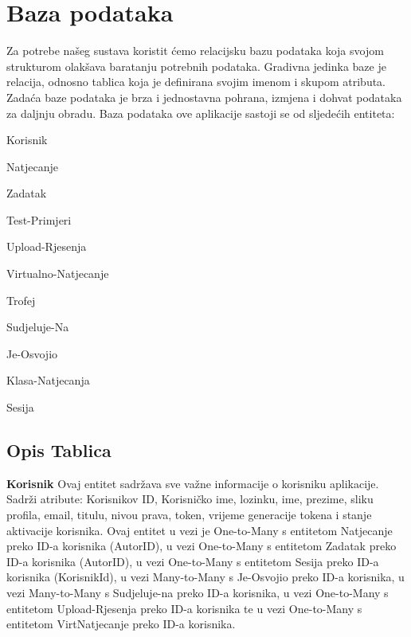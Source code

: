 				
		\section{Baza podataka}
		
		
		
		\noindent Za potrebe našeg sustava koristit  ćemo relacijsku bazu podataka koja svojom strukturom olakšava baratanju potrebnih podataka. Gradivna jedinka baze je relacija, odnosno tablica koja je definirana svojim imenom i skupom atributa. Zadaća baze podataka je brza i jednostavna pohrana, izmjena i dohvat podataka za daljnju obradu.
		Baza podataka ove aplikacije sastoji se od sljedećih entiteta:
		\begin{packed_item}
			\item Korisnik
			\item Natjecanje
			\item Zadatak
			\item Test-Primjeri
			\item Upload-Rjesenja
			\item Virtualno-Natjecanje
			\item Trofej
			\item Sudjeluje-Na
			\item Je-Osvojio
			\item Klasa-Natjecanja
			\item Sesija
		\end{packed_item}
		\subsection{Opis Tablica}
		\noindent \textbf{Korisnik} \space \space Ovaj entitet sadržava sve važne informacije o korisniku aplikacije.
		Sadrži atribute: Korisnikov ID, Korisničko ime, lozinku, ime, prezime, sliku profila, email, titulu, nivou prava, token, vrijeme generacije tokena i stanje aktivacije korisnika. Ovaj entitet u vezi je
		One-to-Many s entitetom Natjecanje preko ID-a korisnika (AutorID), u vezi One-to-Many s entitetom Zadatak preko ID-a korisnika (AutorID), u vezi One-to-Many s entitetom Sesija preko ID-a korisnika (KorisnikId), u vezi Many-to-Many s  Je-Osvojio preko ID-a korisnika, u vezi Many-to-Many s  Sudjeluje-na preko ID-a korisnika, u vezi One-to-Many s entitetom Upload-Rjesenja preko ID-a korisnika  te u vezi One-to-Many s entitetom VirtNatjecanje preko ID-a korisnika.
		
